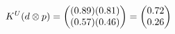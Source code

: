 \documentclass[preview]{standalone}
\begin{document}
\begin{align*}
\special{dvisvgm:raw <g id='unique000'>}K^U(d \otimes p) = \begin{pmatrix} (0.89)(0.81) \\ (0.57)(0.46) \end{pmatrix} = \begin{pmatrix} 0.72 \\ 0.26 \end{pmatrix}\special{dvisvgm:raw </g>}
\end{align*}
\end{document}
